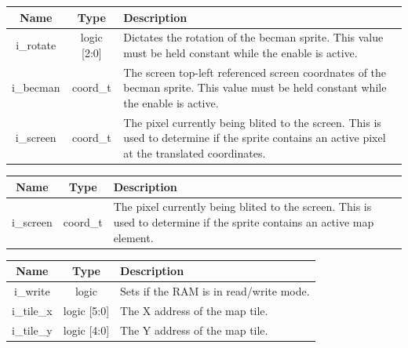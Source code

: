 \documentclass[12pt]{article}
\begin{document}
\vspace{0.5in}
\begingroup
{}
\label{tab:input_becman_state}
\begin{tabularx}{\linewidth}{ ||c|c|X|| }
    \hline
    Name & Type & Description \\
    \hline
    i\_rotate & logic [2:0] & Dictates the rotation of the becman sprite. This
    value must be held constant while the enable is active. \\
    i\_becman & coord\_t & The screen top-left referenced screen coordnates of the
    becman sprite. This value must be held constant while the enable is active. \\
    i\_screen & coord\_t & The pixel currently being blited to the screen. This is
    used to determine if the sprite contains an active pixel at the translated
    coordinates. \\
    \hline
\end{tabularx}
\endgroup

\vspace{0.5in}
\begingroup
{}
\label{tab:input_map_sprite}
\begin{tabularx}{\linewidth}{ ||c|c|X|| }
    \hline
    Name & Type & Description \\
    \hline
    i\_screen & coord\_t & The pixel currently being blited to the screen. This is
    used to determine if the sprite contains an active map element. \\
    \hline
\end{tabularx}
\endgroup

\vspace{0.5in}
\begingroup
{}
\label{tab:input_map_ram}
\begin{tabularx}{\linewidth}{ ||c|c|X|| }
    \hline
    Name & Type & Description \\
    \hline
    i\_write & logic & Sets if the RAM is in read/write mode. \\
    i\_tile\_x & logic [5:0] & The X address of the map tile. \\
    i\_tile\_y & logic [4:0] & The Y address of the map tile. \\
    \hline
\end{tabularx}
\endgroup
\end{document}
